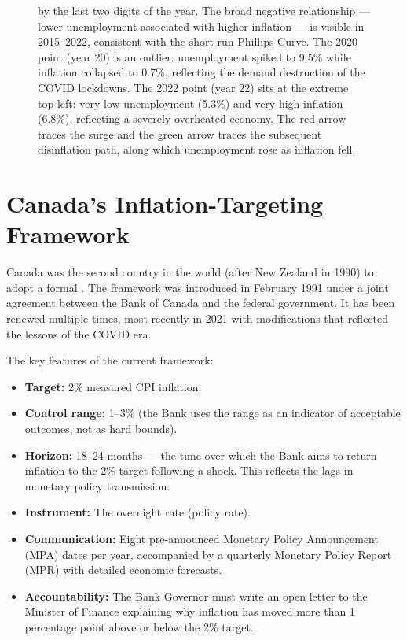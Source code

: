 \begin{figure}[H]
{by the last two digits of the year. The broad negative relationship
--- lower unemployment associated with higher inflation --- is visible
in 2015--2022, consistent with the short-run Phillips Curve. The 2020
point (year 20) is an outlier: unemployment spiked to 9.5\% while
inflation collapsed to 0.7\%, reflecting the demand destruction of
the COVID lockdowns. The 2022 point (year 22) sits at the extreme
top-left: very low unemployment (5.3\%) and very high inflation (6.8\%),
reflecting a severely overheated economy. The red arrow traces the
surge and the green arrow traces the subsequent disinflation path,
along which unemployment rose as inflation fell.}
\label{fig:phillips_curve}
\end{figure}

\section{Canada's Inflation-Targeting Framework}
\label{sec:inflation_targeting}

Canada was the second country in the world (after New Zealand in 1990)
to adopt a formal . The framework was introduced
in February 1991 under a joint agreement between the Bank of Canada and
the federal government. It has been renewed multiple times, most recently
in 2021 with modifications that reflected the lessons of the COVID era.

The key features of the current framework:

\begin{itemize}
  \item \textbf{Target:} 2\% measured CPI inflation.
  \item \textbf{Control range:} 1--3\% (the Bank uses the range as an
        indicator of acceptable outcomes, not as hard bounds).
  \item \textbf{Horizon:} 18--24 months --- the time over which the Bank
        aims to return inflation to the 2\% target following a shock.
        This reflects the lags in monetary policy transmission.
  \item \textbf{Instrument:} The overnight rate (policy rate).
  \item \textbf{Communication:} Eight pre-announced Monetary Policy
        Announcement (MPA) dates per year, accompanied by a quarterly
        Monetary Policy Report (MPR) with detailed economic forecasts.
  \item \textbf{Accountability:} The Bank Governor must write an open
        letter to the Minister of Finance explaining why inflation has
        moved more than 1 percentage point above or below the 2\% target.
\end{itemize}

